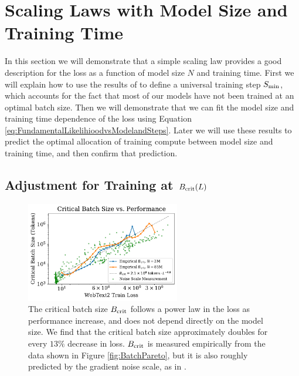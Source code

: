 \documentclass[english]{article}
\begin{document}
\section{Scaling Laws with Model Size and Training Time}
\label{sec:ScalingSizeandSteps}

In this section we will demonstrate that a simple scaling law provides a good description for the loss as a function of model size $N$ and training time.  First we will explain how to use the results of \cite{1812.06162}  to define a universal training step $S_{\rm min}$, which accounts for the fact that most of our models have not been trained at an optimal batch size.   Then we will demonstrate that we can fit the model size and training time dependence of the loss using Equation \eqref{eq:FundamentalLikelihioodvsModelandSteps}.  Later we will use these results to predict the optimal allocation of training compute between model size and training time, and then confirm that prediction.

\subsection{Adjustment for Training at $B_{\rm crit}(L)$}
\label{sec:OptimalBatchSize}

\begin{figure}
\noindent \centering{} 
\includegraphics[width=0.60\textwidth]{CriticalBatchSizeVsPerf}
\caption[Critical batch size]{The critical batch size $B_{\rm crit}$ follows a power law in the loss as performance increase, and does not depend directly on the model size.  We find that the critical batch size approximately doubles for every $13\%$ decrease in loss.  $B_{\rm crit}$  is measured empirically from the data shown in Figure \ref{fig:BatchPareto}, but it is also roughly predicted by the gradient noise scale, as in \cite{1812.06162}.  \label{fig:OptimalBatchSize}}
\end{figure}
\end{document}
